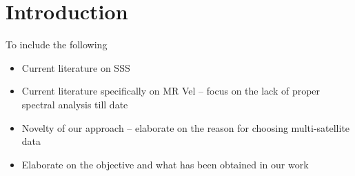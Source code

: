 \section{Introduction}
    To include the following
    \begin{itemize}
        \item Current literature on SSS
        \item Current literature specifically on MR Vel -- focus on the lack of proper spectral analysis till date
        \item Novelty of our approach -- elaborate on the reason for choosing multi-satellite data
        \item Elaborate on the objective and what has been obtained in our work
    \end{itemize}
